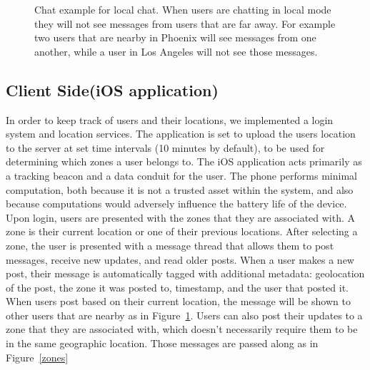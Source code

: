 \begin{figure}
\caption{Chat example for local chat.  When users are chatting in local mode they will not see messages from users that are far away.  For example two users that are nearby in Phoenix will see messages from one another, while a user in Los Angeles will not see those messages.}
\label{chatExample}
\end{figure}

\subsection{Client Side(iOS application)}
In order to keep track of users and their locations, we implemented a login system and location services.  The application is set to upload the users location to the server at set time intervals (10 minutes by default), to be used for determining which zones a user belongs to. The iOS application acts primarily as a tracking beacon and a data conduit for the user.  The phone performs minimal computation, both because it is not a trusted asset within the system, and also because computations would adversely influence the battery life of the device.  Upon login, users are presented with the zones that they are associated with. A zone is their current location or one of their previous locations.  After selecting a zone, the user is presented with a message thread that allows them to post messages, receive new updates, and read older posts. When a user makes a new post, their message is automatically tagged with additional metadata: geolocation of the post, the zone it was posted to, timestamp, and the user that posted it. When users post based on their current location, the message will be shown to other users that are nearby as in Figure~\ref{chatExample}.  Users can also post their updates to a zone that they are associated with, which doesn't necessarily require them to be in the same geographic location.  Those messages are passed along as in Figure~\ref{zones}

